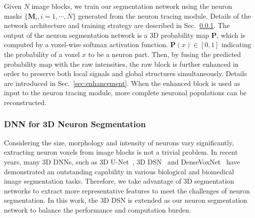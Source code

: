 Given $N$ image blocks, we train our segmentation network using the neuron masks $\{\mathbf{M}_i, i=1,\cdots,N\}$ generated from the neuron tracing module.
Details of the network architecture and training strategy are described in Sec.~\ref{sec:network}.
The output of the neuron segmentation network is a 3D probability map $\mathbf{P}$, which is computed by a voxel-wise softmax activation function. $\mathbf{P}(x)\in [0,1]$ indicating the probability of a voxel $x$ to be a neuron part.
Then, by fusing the predicted probability map with the raw intensities, the raw block is further enhanced in order to preserve both local signals and global structures simultaneously. Details are introduced in Sec.~\ref{sec:enhancement}.
When the enhanced block is used as input to the neuron tracing module, more complete neuronal populations can be reconstructed.

\subsubsection{DNN for 3D Neuron Segmentation}
\label{sec:network}

Considering the size, morphology and intensity of neurons vary significantly, extracting neuron voxels from image blocks is not a trivial problem.
In recent years, many 3D DNNs, such as 3D U-Net~\cite{Cicek2016}, 3D DSN~\cite{Dou2017} and DenseVoxNet~\cite{Yu2017} have demonstrated an outstanding capability in various biological and biomedical image segmentation tasks.
Therefore, we take advantage of 3D segmentation networks to extract more representative features to meet the challenges of neuron segmentation.
In this work, the 3D DSN is extended as our neuron segmentation network to balance the performance and computation burden.


